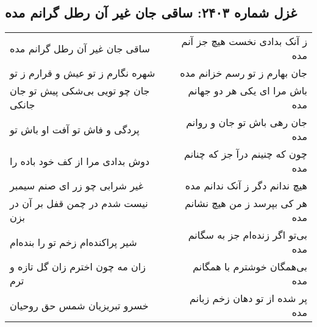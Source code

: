 \begin{center}
\section*{غزل شماره ۲۴۰۳: ساقی جان غیر آن رطل گرانم مده}
\label{sec:2403}
\begin{longtable}{l p{0.5cm} r}
ساقی جان غیر آن رطل گرانم مده
&&
ز آنک بدادی نخست هیچ جز آنم مده
\\
شهره نگارم ز تو عیش و قرارم ز تو
&&
جان بهارم ز تو رسم خزانم مده
\\
جان چو تویی بی‌شکی پیش تو جان جانکی
&&
باش مرا ای یکی هر دو جهانم مده
\\
پردگی و فاش تو آفت او باش تو
&&
جان رهی باش تو جان و روانم مده
\\
دوش بدادی مرا از کف خود باده را
&&
چون که چنینم درآ جز که چنانم مده
\\
غیر شرابی چو زر ای صنم سیمبر
&&
هیچ ندانم دگر ز آنک ندانم مده
\\
نیست شدم در چمن قفل بر آن در بزن
&&
هر کی بپرسد ز من هیچ نشانم مده
\\
شیر پراکنده‌ام زخم تو را بنده‌ام
&&
بی‌تو اگر زنده‌ام جز به سگانم مده
\\
زان مه چون اخترم زان گل تازه و ترم
&&
بی‌همگان خوشترم با همگانم مده
\\
خسرو تبریزیان شمس حق روحیان
&&
پر شده از تو دهان زخم زبانم مده
\\
\end{longtable}
\end{center}
